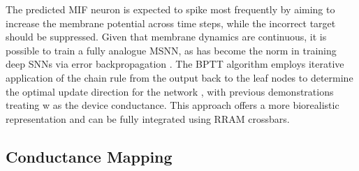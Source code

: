 

\noindent The predicted MIF neuron is expected to spike most frequently by aiming to increase the membrane potential across time steps, while the incorrect target should be suppressed. Given that membrane dynamics are continuous, it is possible to train a fully analogue MSNN, as has become the norm in training deep SNNs via error backpropagation \cite{neftci2019surrogate}. The BPTT algorithm employs iterative application of the chain rule from the output back to the leaf nodes to determine the optimal update direction for the network \cite{eshraghian2023training}, with previous demonstrations treating w as the device conductance. This approach offers a more biorealistic representation and can be fully integrated using RRAM crossbars.

\subsection[Conductance Mapping]{Conductance Mapping}




